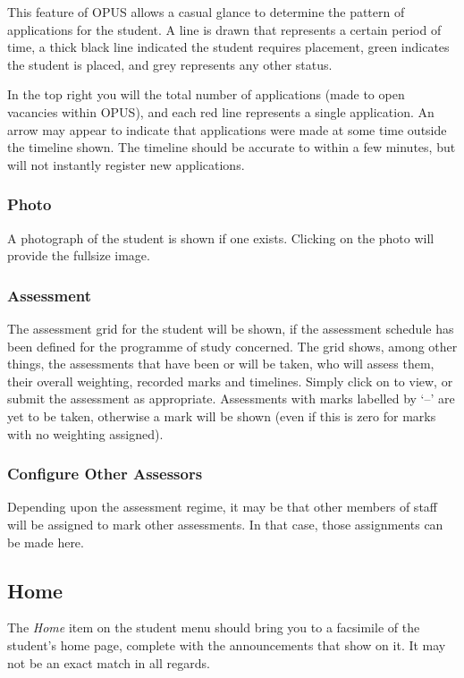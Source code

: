 \documentclass[12 pt]{book}
\begin{document}
This feature of OPUS allows a casual glance to determine the pattern of
applications for the student. A line is drawn that represents a certain
period of time, a thick black line indicated the student requires placement,
green indicates the student is placed, and grey represents any other 
status.

In the top right you will the total number of applications (made to open
vacancies within OPUS), and each red line represents a single application. An
arrow may appear to indicate that applications were made at some time outside
the timeline shown. The timeline should be accurate to within a few minutes,
but will not instantly register new applications.

\subsubsection{Photo}

A photograph of the student is shown if one exists. Clicking on the photo will
provide the fullsize image.

\subsubsection{Assessment}

The assessment grid for the student will be shown, if the assessment schedule
has been defined for the programme of study concerned. The grid shows, among
other things, the assessments that have been or will be taken, who will assess
them, their overall weighting, recorded marks and timelines. Simply click on
 to view, or submit the assessment as appropriate. Assessments with marks
labelled by `--' are yet to be taken, otherwise a mark will be shown (even if
this is zero for marks with no weighting assigned).

\subsubsection{Configure Other Assessors}

Depending upon the assessment regime, it may be that other members of staff will
be assigned to mark other assessments. In that case, those assignments can be
made here.

\subsection{Home}

The \emph{Home} item on the student menu should bring you to a facsimile of the
student's home page, complete with the announcements that show on it. It may
not be an exact match in all regards.
\end{document}
